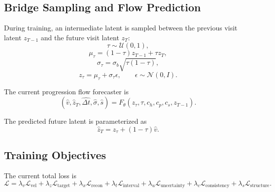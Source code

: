\subsection{Bridge Sampling and Flow Prediction}

During training, an intermediate latent is sampled between the previous visit latent $z_{T-1}$ and the future visit latent $z_T$:
\begin{equation}
\tau \sim \mathcal{U}(0,1),
\end{equation}
\begin{equation}
\mu_\tau = (1-\tau)z_{T-1} + \tau z_T,
\end{equation}
\begin{equation}
\sigma_\tau = \sigma_b \sqrt{\tau(1-\tau)},
\end{equation}
\begin{equation}
z_\tau = \mu_\tau + \sigma_\tau \epsilon, \qquad \epsilon \sim \mathcal{N}(0,I).
\end{equation}

The current progression flow forecaster is
\begin{equation}
(\hat{v}, \hat{z}_T, \widehat{\Delta t}, \hat{\sigma}, \hat{s})
=
F_\theta(z_\tau,\tau,c_h,c_p,c_s,z_{T-1}).
\end{equation}

The predicted future latent is parameterized as
\begin{equation}
\hat{z}_T = z_\tau + (1-\tau)\hat{v}.
\end{equation}

\subsection{Training Objectives}

The current total loss is
\begin{equation}
\mathcal{L} =
\lambda_v \mathcal{L}_{\mathrm{vel}}
+ \lambda_z \mathcal{L}_{\mathrm{target}}
+ \lambda_x \mathcal{L}_{\mathrm{recon}}
+ \lambda_t \mathcal{L}_{\mathrm{interval}}
+ \lambda_u \mathcal{L}_{\mathrm{uncertainty}}
+ \lambda_c \mathcal{L}_{\mathrm{consistency}}
+ \lambda_s \mathcal{L}_{\mathrm{structure}}.
\end{equation}

